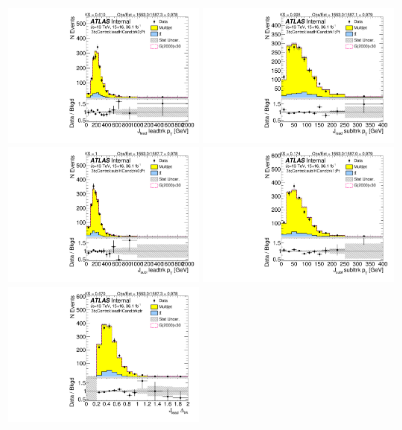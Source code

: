 \begin{figure}[htbp!]
\begin{center}
\includegraphics[width=0.45\textwidth,angle=-90]{figures/boosted/Control/b77_ThreeTag_Control_leadHCand_trk0_Pt.pdf}
\includegraphics[width=0.45\textwidth,angle=-90]{figures/boosted/Control/b77_ThreeTag_Control_leadHCand_trk1_Pt.pdf}\\
\includegraphics[width=0.45\textwidth,angle=-90]{figures/boosted/Control/b77_ThreeTag_Control_sublHCand_trk0_Pt.pdf}
\includegraphics[width=0.45\textwidth,angle=-90]{figures/boosted/Control/b77_ThreeTag_Control_sublHCand_trk1_Pt.pdf}\\
\includegraphics[width=0.45\textwidth,angle=-90]{figures/boosted/Control/b77_ThreeTag_Control_leadHCand_trk_dr.pdf}

\end{center}
\end{figure}
